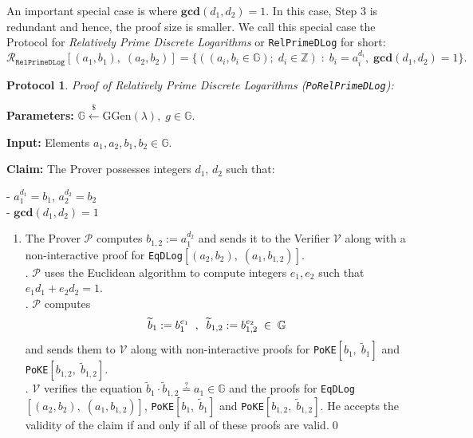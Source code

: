\documentclass[11pt, lettersize, notitlepage, leqno, footskip=0.6cm]{article}
\newcommand{\bz}{\mathbb Z}
\newcommand{\ttt}{\texttt}
\newcommand{\bG}{\mathbb{G}}
\newcommand{\wti}{\widetilde}
\newcommand{\mc}{\mathcal}
\newcommand{\mb}{\mathbb}
\newcommand{\mbf}{\mathbf}
\newcommand{\mr}{\mathrm}
\newcommand{\lamb}{\lambda}
\newcommand{\V}{\mc{V}}
\newcommand{\vs}{\vspace{-0.15cm}}
\newcommand{\noin}{\noindent}
\newcommand{\GCD}{\mbf{gcd}}
\newtheorem{Prot}[Thm]{Protocol}
\numberwithin{equation}{section}
\begin{document}
\noin An important special case is where $\GCD(d_1, d_2) = 1$. In this case, Step 3 is redundant and hence, the proof size is smaller. We call this special case the Protocol for \textit{Relatively Prime Discrete Logarithms} or \verb|RelPrimeDLog| for short: \[\mc{R}_{{\ttt{RelPrimeDLog}}}[(a_1,b_1),\;(a_2,b_2)] = \big\{((a_i, b_i\in\mb{G});\;d_i\in\bz)\;:\; b_i = a_i^{d_i},\;\GCD(d_1,d_2)=1 \big\} .\] 



\begin{Prot} \normalfont \hypertarget{RP}{\textit{Proof of Relatively Prime Discrete Logarithms}} (\verb|PoRelPrimeDLog|):\end{Prot} \vspace{-0.3cm}

\noin \textbf{Parameters:} $\mb{G}\xleftarrow{\$} \mr{GGen}(\lamb), \; g\in \mb{G}$.

\noin \textbf{Input:} Elements $a_1, a_2, b_1, b_2 \in \mb{G}$. 

\noin \textbf{Claim:} The Prover possesses integers $d_1$, $d_2$ such that:

\noin - $a_1^{d_1} = b_1$, $a_2^{d_2} = b_2$\\
\noin - $\GCD(d_1, d_2) = 1$
 

\begin{enumerate}[wide, labelwidth=!, labelindent=0pt]\vs \item The Prover $\mc{P}$ computes $b_{1,2}:= a_1^{d_2}$ and sends it to the Verifier $\V$ along with a\\ non-interactive proof for \verb|EqDLog|$[(a_2, b_2),\; (a_1, b_{1,2})]$.\\
\noin 2. $\mc{P}$ uses the Euclidean algorithm to compute integers $e_1, e_2$ such that $e_1d_1 + e_2d_2 = 1$.\\
\noin 3. $\mc{P}$ computes \vs $$\wti{b}_1:= b_1^{e_1}\;\;,\;\; \wti{b}_{1,2}:= b_{1,2}^{e_2}\;\in\;\bG \vs $$ and sends them to $\V$ along with non-interactive proofs for \verb|PoKE|$[b_1,\; \wti{b}_1]$ and \verb|PoKE|$[b_{1,2},\; \wti{b}_{1,2}]$.\\
\noin 4. $\mc{V}$ verifies the equation $\wti{b}_1\cdot\wti{b}_{1,2}\stackrel{?}{=} a_1\in\bG $ and the proofs for \verb|EqDLog|$[(a_2, b_2),\; (a_1, b_{1,2})]$, \verb|PoKE|$[b_1,\; \wti{b}_1]$ and \verb|PoKE|$[b_{1,2},\; \wti{b}_{1,2}]$. He accepts the validity of the claim if and only if all of these proofs are valid.\qed \end{enumerate}

\vspace{0.1cm}
\end{document}
